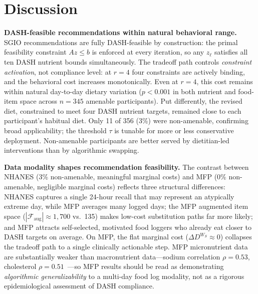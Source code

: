 \documentclass[journal]{IEEEtran}
\newcommand{\Faug}{\mathcal{F}_{\mathrm{aug}}}
\newcommand{\bW}{W_S}
\begin{document}
\section{Discussion}
\label{sec:discussion}

\textbf{DASH-feasible recommendations within natural behavioral range.}
SGIO recommendations are fully DASH-feasible by construction: the
primal feasibility constraint $Az \leq b$ is enforced at every
iteration, so any $z_\ell$ satisfies all ten DASH nutrient bounds
simultaneously. The tradeoff path controls \emph{constraint activation},
not compliance level: at $r{=}4$ four constraints are actively binding,
and the behavioral cost increases monotonically. Even at $r{=}4$, this
cost remains within natural day-to-day dietary variation ($p{<}0.001$
in both nutrient and food-item space across $n{=}345$ amenable
participants). Put differently, the revised diet, constrained to meet
four DASH nutrient targets, remained close to each participant's
habitual diet. Only 11 of 356 (3\%) were non-amenable, confirming broad
applicability; the threshold $\tau$ is tunable for more or less
conservative deployment. Non-amenable participants are better served by
dietitian-led interventions than by algorithmic swapping.

\textbf{Data modality shapes recommendation feasibility.}
The contrast between NHANES (3\% non-amenable, meaningful marginal costs)
and MFP (0\% non-amenable, negligible marginal costs) reflects three
structural differences: NHANES captures a single 24-hour recall that
may represent an atypically extreme day, while MFP averages many logged
days; the MFP augmented item space ($|\Faug| \approx 1{,}700$ vs.\
135) makes low-cost substitution paths far more likely; and MFP attracts
self-selected, motivated food loggers who already eat closer to DASH
targets on average. On MFP, the flat marginal cost ($\Delta D^{\bW}
\approx 0$) collapses the tradeoff path to a single clinically actionable
step. MFP micronutrient data are substantially weaker than macronutrient
data---sodium correlation $\rho{=}0.53$, cholesterol
$\rho{=}0.51$~\cite{evenepoel2020mfp,morello2025mfp}---so MFP
results should be read as demonstrating \emph{algorithmic
generalizability} to a multi-day food log modality, not as a rigorous
epidemiological assessment of DASH compliance.
\end{document}
